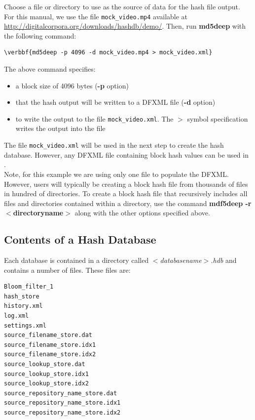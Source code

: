 \documentclass[11pt,fleqn]{article} %
\begin{document}
Choose a file or directory to use as the source of data for the hash file output. For this manual, we use the file \texttt{mock\_video.mp4} available at \url{http://digitalcorpora.org/downloads/hashdb/demo/}. Then, run \textbf{md5deep} with the following command:\\
\begin{Verbatim}[commandchars=\\\{\}]
\verbbf{md5deep -p 4096 -d mock_video.mp4 > mock_video.xml}
\end{Verbatim}
The above command specifies:
\begin{itemize}
\item a block size of 4096 bytes (\textbf{-p} option) 
\item that the hash output will be written to a DFXML file (\textbf{-d} option)
\item to write the output to the file \texttt{mock\_video.xml}. The  $>$ symbol specification writes the output into the file 
\end{itemize}
 The file \texttt{mock\_video.xml} will be used in the next step to create the hash database. However, any DFXML file containing block hash values can be used in \hash.\\

Note, for this example we are using only one file to populate the DFXML. However, users will typically be creating a block hash file from thousands of files in hundred of directories. To create a block hash file that recursively includes all files and directories contained within a directory, use the command \textbf{mdf5deep -r $<$directoryname$>$} along with the other options specified above.

\subsection{Contents of a Hash Database}
Each \hash database is contained in a directory called \textit{$<$databasename$>$.hdb} and contains a number of files. These files are:
\begin{verbatim}
Bloom_filter_1
hash_store
history.xml
log.xml
settings.xml
source_filename_store.dat
source_filename_store.idx1
source_filename_store.idx2
source_lookup_store.dat
source_lookup_store.idx1
source_lookup_store.idx2
source_repository_name_store.dat
source_repository_name_store.idx1
source_repository_name_store.idx2
\end{verbatim}
\end{document}
